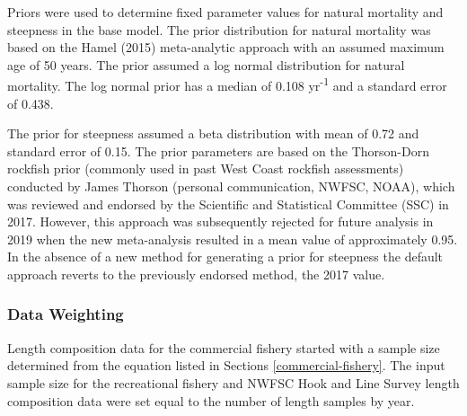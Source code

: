 \documentclass[11pt,
  english,
  a4paper,
]{article}
\begin{document}

Priors were used to determine fixed parameter values for natural mortality and steepness in the base model. The prior distribution for natural mortality was based on the Hamel {(2015)\leavevmode\tagmcend\tagstructend} meta-analytic approach with an assumed maximum age of 50 years. The prior assumed a log normal distribution for natural mortality. The log normal prior has a median of 0.108 yr\textsuperscript{-1} and a standard error of 0.438.

\leavevmode\tagmcend\tagstructend\par


The prior for steepness assumed a beta distribution with mean of 0.72 and standard error of 0.15. The prior parameters are based on the Thorson-Dorn rockfish prior (commonly used in past West Coast rockfish assessments) conducted by James Thorson (personal communication, NWFSC, NOAA), which was reviewed and endorsed by the Scientific and Statistical Committee (SSC) in 2017. However, this approach was subsequently rejected for future analysis in 2019 when the new meta-analysis resulted in a mean value of approximately 0.95. In the absence of a new method for generating a prior for steepness the default approach reverts to the previously endorsed method, the 2017 value.

\leavevmode\tagmcend\tagstructend\par


\hypertarget{data-weighting}{%
\subsubsection{Data Weighting}\label{data-weighting}}

\leavevmode\tagmcend\tagstructend


Length composition data for the commercial fishery started with a sample size determined from the equation listed in Sections \ref{commercial-fishery}. The input sample size for the recreational fishery and NWFSC Hook and Line Survey length composition data were set equal to the number of length samples by year.

\leavevmode\tagmcend\tagstructend\par
\end{document}
